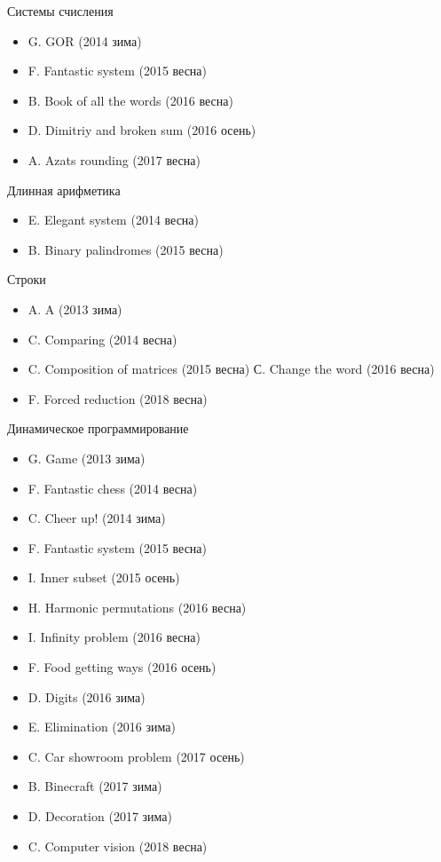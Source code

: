 Системы счисления
\begin{itemize}
\item G. GOR (2014 зима)
\item F. Fantastic system (2015 весна)
\item B. Book of all the words (2016 весна)
\item D. Dimitriy and broken sum (2016 осень)
\item A. Azats rounding (2017 весна)
\end{itemize}

Длинная арифметика
\begin{itemize}
\item E. Elegant system (2014 весна)
\item B. Binary palindromes (2015 весна)
\end{itemize}

Строки
\begin{itemize}
\item A. A (2013 зима)
\item C. Comparing (2014 весна)
\item C. Composition of matrices (2015 весна)
С. Change the word (2016 весна)
\item F. Forced reduction (2018 весна)
\end{itemize}

Динамическое программирование
\begin{itemize}
\item G. Game (2013 зима)
\item F. Fantastic chess (2014 весна)
\item C. Cheer up! (2014 зима)
\item F. Fantastic system (2015 весна)
\item I. Inner subset (2015 осень)
\item H. Harmonic permutations (2016 весна)
\item I. Infinity problem (2016 весна)
\item F. Food getting ways (2016 осень)
\item D. Digits (2016 зима)
\item E. Elimination (2016 зима)
\item C. Car showroom problem (2017 осень)
\item B. Binecraft (2017 зима)
\item D. Decoration (2017 зима)
\item C. Computer vision (2018 весна)
\end{itemize}

